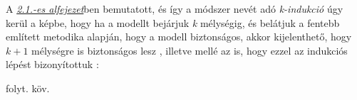 A \hyperlink{section.2.1}{\emph{2.1.-es alfejezet}}ben bemutatott, és így a módszer nevét adó \emph{k-indukció} úgy kerül a képbe, hogy ha a modellt bejárjuk \emph{k} mélységig, és belátjuk a fentebb említett metodika alapján, hogy a modell biztonságos, akkor kijelenthető, hogy $k+1$ mélységre is biztonságos lesz \cite{donaldson_cikk}, illetve mellé az is, hogy ezzel az indukciós lépést bizonyítottuk \cite{k_induction_article}:

folyt. köv.



























\begin{comment}
\begin{algorithm}[H]
	\SetAlgoLined
	\KwResult{}
	i=0\\
	\While{True}{
		instructions\\
		\eIf{condition}{
			instructions1\\
			instructions2\\
		}{
			instructions3\\
		}
	}
	\caption{Checking if model is \emph{P}-safe}
\end{algorithm}í
\end{comment}

